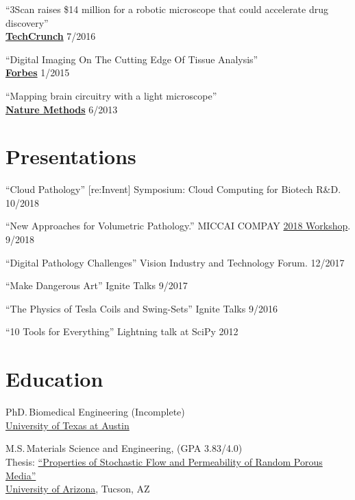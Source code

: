 \documentclass{res}
\begin{document}
\begin{resume}
  ``3Scan raises \$14 million for a robotic microscope that could accelerate drug discovery'' \\
  \href{https://techcrunch.com/2016/07/11/3scan-raises-14-million-for-a-robotic-microscope-that-could-accelerate-drug-discovery/
  }{\textbf{TechCrunch}} \hfill 7/2016
  
  ``Digital Imaging On The Cutting Edge Of Tissue Analysis'' \\
  \href{https://www.forbes.com/sites/joshwolfe/2015/01/28/digital-imaging-on-the-cutting-edge-of-tissue-analysis/}{\textbf{Forbes}} \hfill 1/2015
  
  ``Mapping brain circuitry with a light microscope'' \\
  \href{https://www.ncbi.nlm.nih.gov/pmc/articles/PMC3982327/}{\textbf{Nature Methods}} \hfill 6/2013
  
\section{Presentations}
  ``Cloud Pathology''
  [re:Invent] Symposium: Cloud Computing for Biotech R\&D. \hfill 10/2018

  ``New Approaches for Volumetric Pathology.''
  MICCAI COMPAY \href{https://sites.google.com/site/compaysymposium2018/speakers}{2018 Workshop}. \hfill 9/2018

  ``Digital Pathology Challenges''
  Vision Industry and Technology Forum. \hfill 12/2017

  ``Make Dangerous Art''
  Ignite Talks \hfill 9/2017

  ``The Physics of Tesla Coils and Swing-Sets''
  Ignite Talks \hfill 9/2016

  ``10 Tools for Everything''
  Lightning talk at SciPy \hfill 2012

\section{Education}
  PhD.\,Biomedical Engineering (Incomplete) \\
  \href{https://www.bme.utexas.edu/}{University of Texas at Austin}
  
  M.S.\,Materials Science and Engineering,
  (GPA 3.83/4.0) \\
  Thesis: \href{http://hdl.handle.net/10150/193422}{``Properties of Stochastic Flow and Permeability of Random Porous Media''} \\
  \href{https://mse.engineering.arizona.edu/}{University of Arizona}, Tucson, AZ
  

\end{resume}
\end{document}
